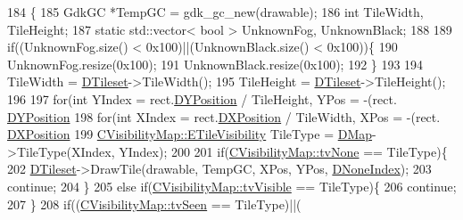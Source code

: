 \begin{DoxyCode}
184                                                                        \{
185     GdkGC *TempGC = gdk\_gc\_new(drawable);
186     \textcolor{keywordtype}{int} TileWidth, TileHeight;
187     \textcolor{keyword}{static} std::vector< bool > UnknownFog, UnknownBlack;
188     
189     \textcolor{keywordflow}{if}((UnknownFog.size() < 0x100)||(UnknownBlack.size() < 0x100))\{
190         UnknownFog.resize(0x100);
191         UnknownBlack.resize(0x100);
192     \}
193     
194     TileWidth = \hyperlink{classCFogRenderer_af9f3956c6e371f112ee1ce5decd7ae89}{DTileset}->TileWidth();
195     TileHeight = \hyperlink{classCFogRenderer_af9f3956c6e371f112ee1ce5decd7ae89}{DTileset}->TileHeight();
196 
197     \textcolor{keywordflow}{for}(\textcolor{keywordtype}{int} YIndex = rect.\hyperlink{structSRectangle_a120aa0a90033bc6e07c36c151a3bbc71}{DYPosition} / TileHeight, YPos = -(rect.
      \hyperlink{structSRectangle_a120aa0a90033bc6e07c36c151a3bbc71}{DYPosition} %
198         \textcolor{keywordflow}{for}(\textcolor{keywordtype}{int} XIndex = rect.\hyperlink{structSRectangle_abcbddb03b3ee416cc33109833b5f075c}{DXPosition} / TileWidth, XPos = -(rect.
      \hyperlink{structSRectangle_abcbddb03b3ee416cc33109833b5f075c}{DXPosition} %
199             \hyperlink{classCVisibilityMap_a6665f905da08825adbb0eee7bd1f2f30}{CVisibilityMap::ETileVisibility} TileType = 
      \hyperlink{classCFogRenderer_a06be3616da23b5fce8ab3407b81788a4}{DMap}->TileType(XIndex, YIndex);
200             
201             \textcolor{keywordflow}{if}(\hyperlink{classCVisibilityMap_a6665f905da08825adbb0eee7bd1f2f30aec106086bdc6328c8c6c02ee1bf32d2c}{CVisibilityMap::tvNone} == TileType)\{
202                 \hyperlink{classCFogRenderer_af9f3956c6e371f112ee1ce5decd7ae89}{DTileset}->DrawTile(drawable, TempGC, XPos, YPos, 
      \hyperlink{classCFogRenderer_ac4731c0fcb7e73be9fd6839659e519ba}{DNoneIndex});
203                 \textcolor{keywordflow}{continue};
204             \}
205             \textcolor{keywordflow}{else} \textcolor{keywordflow}{if}(\hyperlink{classCVisibilityMap_a6665f905da08825adbb0eee7bd1f2f30a3c881652ef7164aa086e595eef0ff5d6}{CVisibilityMap::tvVisible} == TileType)\{
206                 \textcolor{keywordflow}{continue};
207             \}
208             \textcolor{keywordflow}{if}((\hyperlink{classCVisibilityMap_a6665f905da08825adbb0eee7bd1f2f30ab7c30a117286ac3a8891862f6c1bb5c6}{CVisibilityMap::tvSeen} == TileType)||(

\end{DoxyCode}
